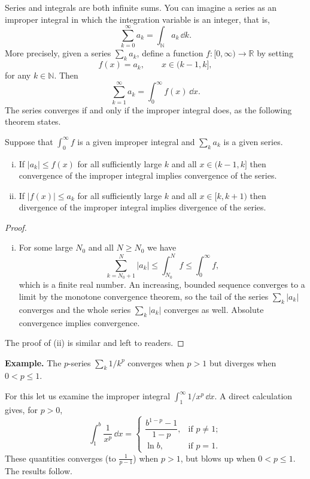 \documentclass[11pt]{article}
\begin{document}
Series and integrals are both infinite sums.
You can imagine a series as an improper integral in which the integration variable is an integer, that is,
\[
  \sum_{k=0}^\infty a_k = \int_{\mathbb{N}} a_k \, \dd k.
\]
More precisely, given a series $\sum_k a_k$, define a function $f: [0,\infty) \to \mathbb{R}$ by setting
\[
  f(x) = a_k, \qquad x \in (k-1, k],
\]
for any $k \in \mathbb{N}$.
Then
\[
  \sum_{k=1}^\infty a_k = \int_0^\infty f(x) \, \dd x.
\]
The series converges if and only if the improper integral does, as the following theorem states.
\begin{thm}
  Suppose that $\int_0^\infty f$ is a given improper integral and $\sum_k a_k$ is a given series.
  \begin{enumerate}[(i)]
    \item If $|a_k| \leqslant f(x)$ for all sufficiently large $k$ and all $x \in (k-1,k]$ then convergence of the improper integral implies convergence of the series.
  \item If $|f(x)| \leqslant a_k$ for all sufficiently large $k$ and all $x \in [k, k+1)$ then divergence of the improper integral implies divergence of the series.
  \end{enumerate}
\end{thm}

\begin{proof}
  \begin{enumerate}[(i)]
    \item For some large $N_0$ and all $N \geqslant N_0$ we have
      \[
	\sum_{k=N_0+1}^N |a_k| \leqslant \int_{N_0}^N f \leqslant \int_0^\infty f,
      \]
      which is a finite real number.
      An increasing, bounded sequence converges to a limit by the monotone convergence theorem, so the tail of the series $\sum_k |a_k|$ converges and the whole series $\sum_k |a_k|$ converges as well.
      Absolute convergence implies convergence.
  \end{enumerate}

  \medskip
  The proof of (ii) is similar and left to readers.
\end{proof}

\noindent\textbf{Example.} The \textsf{$p$-series} $\sum_k 1/k^p$ converges when $p > 1$ but diverges when $0 < p \leqslant 1$.

For this let us examine the improper integral $\int_1^\infty 1/x^p \, \dd x$.
A direct calculation gives, for $p > 0$,
\[
  \int_1^b \frac{1}{x^p} \, \dd x = 
  \begin{cases}
    \dfrac{b^{1-p}-1}{1-p}, & \text{if $p \ne 1$}; \\
    \ln b                , & \text{if $p = 1$}.
  \end{cases}
\]
These quantities converges (to $\frac{1}{p-1}$) when $p>1$, but blows up when $0 < p \leqslant 1$.  The results follow.
\end{document}
